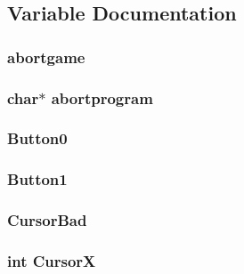 \subsection{Variable Documentation}
\hypertarget{ID__US_8H_ac4a9dc792bc42d983ad78cba0dcc4865}{
\subsubsection[{abortgame}]{ {\bf abortgame}}}
\label{ID__US_8H_ac4a9dc792bc42d983ad78cba0dcc4865}
\hypertarget{ID__US_8H_a4af009c4eb68eb1aaa0a93c8bffb3512}{
\subsubsection[{abortprogram}]{\setlength{\rightskip}{0pt plus 5cm}char$\ast$ {\bf abortprogram}}}
\label{ID__US_8H_a4af009c4eb68eb1aaa0a93c8bffb3512}
\hypertarget{ID__US_8H_a7fa08780907017f971b2dc0909bd77fd}{
\subsubsection[{Button0}]{ {\bf Button0}}}
\label{ID__US_8H_a7fa08780907017f971b2dc0909bd77fd}
\hypertarget{ID__US_8H_aca6b2fe999220340d0569ece03a0026d}{
\subsubsection[{Button1}]{ {\bf Button1}}}
\label{ID__US_8H_aca6b2fe999220340d0569ece03a0026d}
\hypertarget{ID__US_8H_abf5358251c5b519d71e3d8bca8256510}{
\subsubsection[{CursorBad}]{ {\bf CursorBad}}}
\label{ID__US_8H_abf5358251c5b519d71e3d8bca8256510}
\hypertarget{ID__US_8H_af51730b2758fe5daa55ca8445a8f7c3b}{
\subsubsection[{CursorX}]{\setlength{\rightskip}{0pt plus 5cm}int {\bf CursorX}}}
